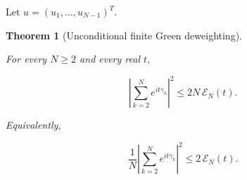 \documentclass[11pt]{amsart}
\numberwithin{equation}{section}
\theoremstyle{plain}
\newtheorem{theorem}{Theorem}[section]
\theoremstyle{definition}
\theoremstyle{remark}
\begin{document}
Let \(u=(u_1,\ldots,u_{N-1})^T\).

\begin{theorem}[Unconditional finite Green deweighting]
\label{thm:unconditional_finite_green_deweighting}

For every \(N\ge2\) and every real \(t\),

\begin{equation}
\left|
\sum_{k=2}^{N}e^{it\gamma_k}
\right|^2
\le
2N\,\mathcal E_N(t).
\label{eq:finite_green_deweighting}
\end{equation}

Equivalently,

\begin{equation}
\frac1N
\left|
\sum_{k=2}^{N}e^{it\gamma_k}
\right|^2
\le
2\,\mathcal E_N(t).
\label{eq:finite_green_deweighting_normalized}
\end{equation}

\end{theorem}
\end{document}
